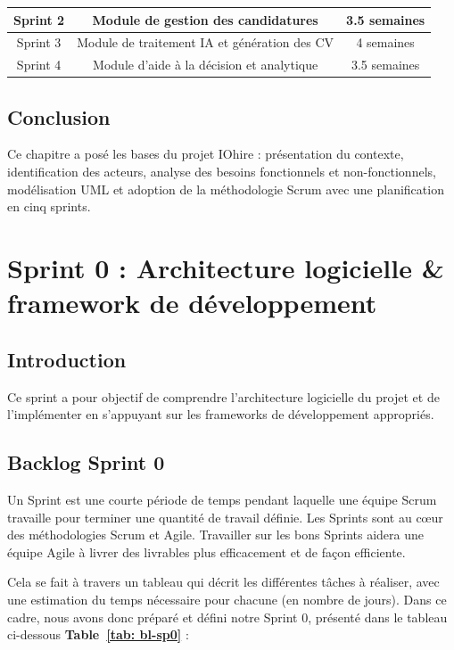 \documentclass[12pt,a4paper,oneside]{report}
\begin{document}
\begin{itemize}
\begin{table}[H]
\begin{tabular}{|c|c|c|}
Sprint 2 & Module de gestion des candidatures & 3.5 semaines \\
\hline

Sprint 3 & Module de traitement IA et génération des CV & 4 semaines \\
\hline

Sprint 4 & Module d'aide à la décision et analytique & 3.5 semaines \\
\hline

\end{tabular}
\label{tab:planning_sprints}
\end{table}

\section*{Conclusion}
Ce chapitre a posé les bases du projet IOhire : présentation du contexte, identification des acteurs, analyse des besoins fonctionnels et non-fonctionnels, modélisation UML et adoption de la méthodologie Scrum avec une planification en cinq sprints.


\chapter{Sprint 0 : Architecture logicielle \& framework de développement}
\pagestyle{avecEntete}
\section*{Introduction}
Ce sprint a pour objectif de comprendre l’architecture logicielle du projet et de l’implémenter en s’appuyant sur les frameworks de développement appropriés.

\section{Backlog Sprint 0}
Un Sprint est une courte période de temps pendant laquelle une équipe Scrum travaille pour terminer une quantité de travail définie. Les Sprints sont au cœur des méthodologies Scrum et Agile. Travailler sur les bons Sprints aidera une équipe Agile à livrer des livrables plus efficacement et de façon efficiente.

Cela se fait à travers un tableau qui décrit les différentes tâches à réaliser, avec une estimation du temps nécessaire pour chacune (en nombre de jours). Dans ce cadre, nous avons donc préparé et défini notre Sprint 0, présenté dans le tableau ci-dessous \textbf{Table~\ref{tab: bl-sp0}} :


\end{itemize}
\end{document}

